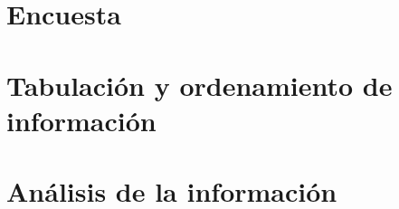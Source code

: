 \section{Encuesta}
\section{Tabulación y ordenamiento de información}
\section{Análisis de la información}